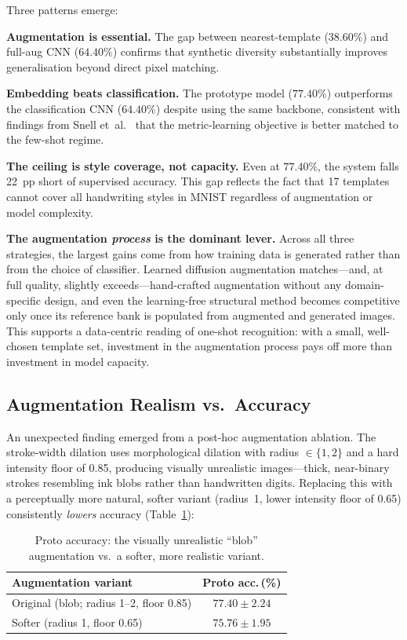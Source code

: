 \documentclass[final,5p,times,twocolumn]{elsarticle}
\begin{document}
Three patterns emerge:

\textbf{Augmentation is essential.}
The gap between nearest-template ($38.60\%$) and full-aug CNN ($64.40\%$) confirms that
synthetic diversity substantially improves generalisation beyond direct pixel matching.

\textbf{Embedding beats classification.}
The prototype model ($77.40\%$) outperforms the classification CNN ($64.40\%$) despite using
the same backbone, consistent with findings from Snell et~al.\ \cite{Snell2017} that the
metric-learning objective is better matched to the few-shot regime.

\textbf{The ceiling is style coverage, not capacity.}
Even at $77.40\%$, the system falls 22~pp short of supervised accuracy.
This gap reflects the fact that 17 templates cannot cover all handwriting styles in MNIST
regardless of augmentation or model complexity.

\textbf{The augmentation \emph{process} is the dominant lever.}
Across all three strategies, the largest gains come from how training data is
generated rather than from the choice of classifier.
Learned diffusion augmentation matches—and, at full quality, slightly exceeds—hand-crafted
augmentation without any domain-specific design, and even the learning-free structural
method becomes competitive only once its reference bank is populated from augmented and
generated images.
This supports a data-centric reading of one-shot recognition: with a small, well-chosen
template set, investment in the augmentation process pays off more than investment in model
capacity.

\subsection{Augmentation Realism vs.\ Accuracy}

An unexpected finding emerged from a post-hoc augmentation ablation.
The stroke-width dilation uses morphological dilation with radius $\in\{1,2\}$ and a hard
intensity floor of 0.85, producing visually unrealistic images—thick, near-binary strokes
resembling ink blobs rather than handwritten digits.
Replacing this with a perceptually more natural, softer variant (radius~1, lower intensity
floor of 0.65) consistently \emph{lowers} accuracy (Table~\ref{tab:augvariants}):

\begin{table}[h]
  \centering
  \caption{Proto accuracy: the visually unrealistic ``blob'' augmentation vs.\ a softer,
           more realistic variant.}
  \label{tab:augvariants}
  \begin{tabular}{@{}lc@{}}
    \toprule
    Augmentation variant & Proto acc.\,(\%) \\
    \midrule
    Original (blob; radius 1--2, floor 0.85)  & $\mathbf{77.40 \pm 2.24}$ \\
    Softer (radius 1, floor 0.65)              & $75.76 \pm 1.95$ \\
    \bottomrule
  \end{tabular}
\end{table}
\end{document}
